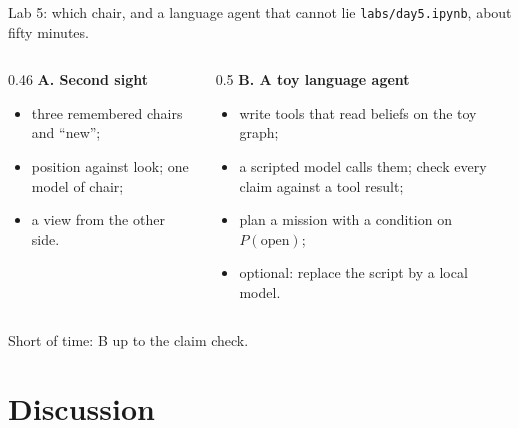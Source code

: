 \documentclass[10pt, aspectratio=169]{beamer}
\begin{document}
\begin{frame}{Lab 5: which chair, and a language agent that cannot lie}
  \texttt{labs/day5.ipynb}, about fifty minutes.
  \begin{columns}[T]
    \begin{column}{0.46\textwidth}
      \small
      \textbf{A. Second sight}
      \begin{itemize}
        \item three remembered chairs and ``new'';
        \item position against look; one model of chair;
        \item a view from the other side.
      \end{itemize}
    \end{column}
    \begin{column}{0.5\textwidth}
      \small
      \textbf{B. A toy language agent}
      \begin{itemize}
        \item write tools that read beliefs on the toy graph;
        \item a scripted model calls them; check every claim against a tool result;
        \item plan a mission with a condition on $P(\text{open})$;
        \item optional: replace the script by a local model.
      \end{itemize}
    \end{column}
  \end{columns}
  \vspace{0.6em}
  \small Short of time: B up to the claim check.
\end{frame}

\section{Discussion}
\end{document}
